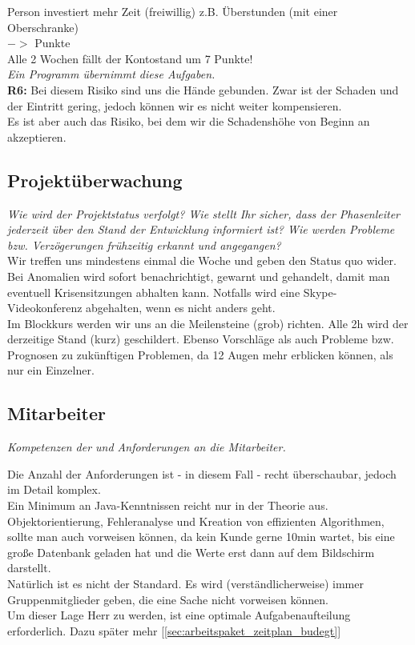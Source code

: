 \documentclass[fontsize=12pt,paper=a4,twoside]{scrartcl}
\begin{document}
\small \color{gray} Person investiert mehr Zeit (freiwillig) z.B. Überstunden (mit einer Oberschranke)\color{black}\\
\small $->$ \color{green}{-1,0 - -5,0 }\color{black} Punkte\\

\small \color{blue} Alle 2 Wochen fällt der Kontostand um 7 Punkte!\color{black}\\

\textit{Ein Programm übernimmt diese Aufgaben.}\\

\textbf{R6:} Bei diesem Risiko sind uns die Hände gebunden. Zwar ist der Schaden und der Eintritt gering, jedoch können wir es nicht weiter kompensieren.\\

Es ist aber auch das Risiko, bei dem wir die Schadenshöhe von Beginn an akzeptieren.\\

\subsection{Projektüberwachung}\label{sec:controlling}
{\em Wie wird der Projektstatus verfolgt? Wie stellt Ihr sicher, dass
  der Phasenleiter jederzeit über den Stand der Entwicklung informiert
  ist? Wie werden Probleme bzw. Verzögerungen frühzeitig erkannt und
  angegangen?}\\

Wir treffen uns mindestens einmal die Woche und geben den Status quo wider. Bei Anomalien wird sofort benachrichtigt, gewarnt und gehandelt, damit man eventuell Krisensitzungen abhalten kann. Notfalls wird eine Skype-Videokonferenz abgehalten, wenn es nicht anders geht.\\
Im Blockkurs werden wir uns an die Meilensteine (grob) richten. Alle 2h wird der derzeitige Stand (kurz) geschildert. Ebenso Vorschläge als auch Probleme bzw. Prognosen zu zukünftigen Problemen, da 12 Augen mehr erblicken können, als nur ein Einzelner.\\ 

\subsection{Mitarbeiter}
{\em Kompetenzen der und Anforderungen an die Mitarbeiter.}

Die Anzahl der Anforderungen ist - in diesem Fall - recht überschaubar, jedoch im Detail komplex.\\
Ein Minimum an Java-Kenntnissen reicht nur in der Theorie aus. Objektorientierung, Fehleranalyse und Kreation von effizienten Algorithmen, sollte man auch vorweisen können, da kein Kunde gerne 10min wartet, bis eine große Datenbank geladen hat und die Werte erst dann auf dem Bildschirm darstellt.\\
Natürlich ist es nicht der Standard. Es wird (verständlicherweise) immer Gruppenmitglieder geben, die eine Sache nicht vorweisen können.\\
Um dieser Lage Herr zu werden, ist eine optimale Aufgabenaufteilung erforderlich. Dazu später mehr [\ref{sec:arbeitspaket_zeitplan_budegt}]\\
\end{document}
